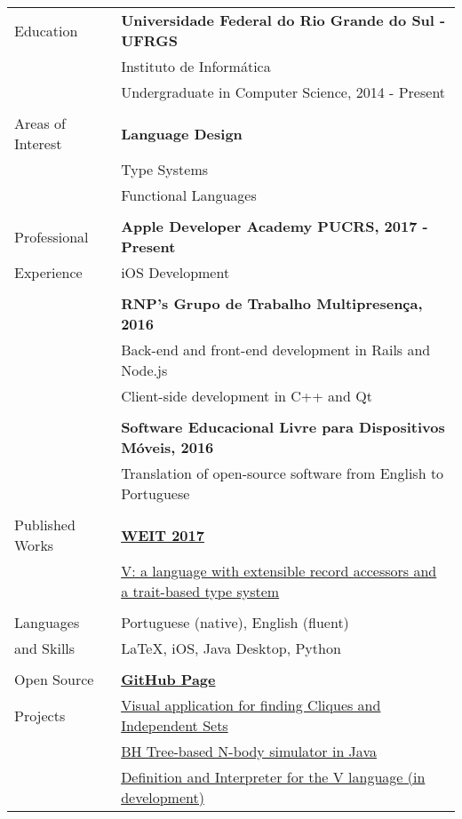 \documentclass[letterpaper,11pt,oneside]{article}
\begin{document}
\noindent \begin{tabular}{@{} l l}
 \Large{Education}    & \textbf{Universidade Federal do Rio Grande do Sul - UFRGS} \\
     & Instituto de Informática \\
     & Undergraduate in Computer Science, 2014 - Present \\
     & \\
 \Large{Areas of Interest}    & \textbf{Language Design} \\
    & Type Systems \\
    & Functional Languages \\
    & \\
 \Large{Professional}    & \textbf{Apple Developer Academy PUCRS, 2017 - Present}\\
    \Large{Experience} & iOS Development\\
    &\\
    & \textbf{RNP's Grupo de Trabalho Multipresença, 2016} \\
    & Back-end and front-end development in Rails and Node.js\\
    & Client-side development in C++ and Qt\\
    & \\
    & \textbf{Software Educacional Livre para Dispositivos Móveis, 2016}\\
    & Translation of open-source software from English to Portuguese\\
    & \\
 \Large{Published Works}    & \href{http://weit2017.inf.ufsm.br/}{\textbf{WEIT 2017}} \\
     &  \href{http://weit2017.inf.ufsm.br/wp-content/uploads/2017/10/Versao_final.pdf}{V: a language with extensible record accessors and a trait-based type system}\\
     & \\
\Large{Languages}   & Portuguese (native), English (fluent) \\
\Large{and Skills}    & \LaTeX, iOS, Java Desktop, Python  \\
&\\
\Large{Open Source}   & \href{https://github.com/AvatarHurden/}{\textbf{GitHub Page}} \\
\Large{Projects}    & \href{https://github.com/AvatarHurden/Clique-and-Ind.Set-Calculator}{Visual application for finding Cliques and Independent Sets} \\
    & \href{https://github.com/AvatarHurden/Simulador-Galaxias}{BH Tree-based N-body simulator in Java}\\
    & \href{https://github.com/AvatarHurden/V}{Definition and Interpreter for the V language (in development)}\\
\end{tabular}
\end{document}

